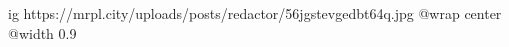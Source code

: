  
 
 
 
 

\ifcmt
  ig https://mrpl.city/uploads/posts/redactor/56jgstevgedbt64q.jpg
  @wrap center
  @width 0.9
\fi

